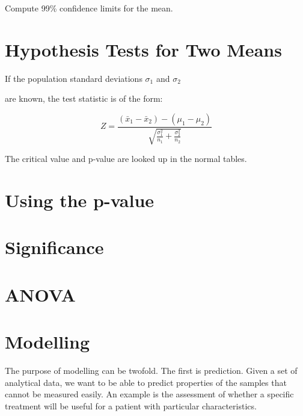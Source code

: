  

Compute 99\% confidence limits for the mean.

\section{Hypothesis Tests for Two Means}

 

If the population standard deviations $\sigma_1$ and $\sigma_2$

are known, the test statistic is of the form:

 

\begin{equation}

Z = \frac{(\bar{x}_1 - \bar{x}_2) - (\mu_1 - \mu_2 ) }{\sqrt{

\frac{\sigma^2_1}{n_1}+\frac{\sigma^2_2}{n_2}} }

\end{equation}

The critical value and p-value are looked up in the normal tables.

 

\section{Using the p-value}

 

\section{Significance}

 

\section{ANOVA}

 

\section{Modelling}

 

The purpose of modelling can be twofold. The first is prediction. Given a set of analytical data, we want to be able to predict properties of the samples that cannot be measured easily. An example is the assessment of whether a specific treatment will be useful for a patient with particular characteristics.

